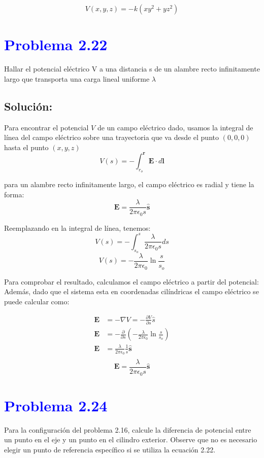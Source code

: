 \documentclass[12pt]{article}
\newcommand{\question}[1]{\textcolor{blue}{\textbf{#1}}}
\begin{document}
\[
    \boxed{V(x,y,z) = -k(xy^2 + yz^2)}
\]


\section*{\question{ Problema 2.22}} Hallar el potencial eléctrico V a una distancia s de un alambre recto infinitamente largo que transporta una carga lineal uniforme \(\lambda\)

\subsection*{Solución:}
Para encontrar el potencial \(V\) de un campo eléctrico dado,  usamos la integral de línea del campo eléctrico sobre una trayectoria que va desde el punto \((0,0,0)\) hasta el punto \((x,y,z)\)
\[
{V(s)} = -\int_{r_o}^{\mathbf{r}} \mathbf{E}\cdot d \mathbf{l}   
\]    

para un alambre recto infinitamente largo, el campo eléctrico es radial y tiene la forma:
\[
\mathbf{E} = \frac{\lambda}{2\pi \epsilon_0 s} \hat{\mathbf{s}}
\]

Reemplazando en la integral de línea, tenemos:
\[
    {V(s)} = -\int_{s_o}^{s} \frac{\lambda}{2\pi \epsilon_0 s} ds 
\]
\[
\boxed{{V(s)} =  -\frac{\lambda}{2\pi \epsilon_0} \ln{\frac{s}{s_o} }}
\]

Para comprobar el resultado, calculamos el campo eléctrico a partir del potencial:
Además, dado que el sistema esta en coordenadas cilíndricas el campo eléctrico se puede calcular como:

\begin{align*}
    \mathbf{E}  &= -\nabla V = -\frac{\partial V}{\partial s} \hat{s} \\
    \mathbf{E} &= -\frac{\partial}{\partial s} \left(-\frac{\lambda}{2\pi \epsilon_0} \ln{\frac{s}{s_o} } \right) \\
    \mathbf{E} &= \frac{\lambda}{2\pi \epsilon_0} \frac{1}{s} \hat{\mathbf{s}} \\
\end{align*}
\[
\boxed{\mathbf{E} = \frac{\lambda}{2\pi \epsilon_0 s} \hat{\mathbf{s}}}
\]

\section*{\question{ Problema 2.24}}Para la configuración del problema 2.16, calcule la diferencia de potencial entre un punto en el eje y un punto en el cilindro exterior. Observe que no es necesario elegir un punto de referencia específico si se utiliza la ecuación 2.22.
\end{document}
